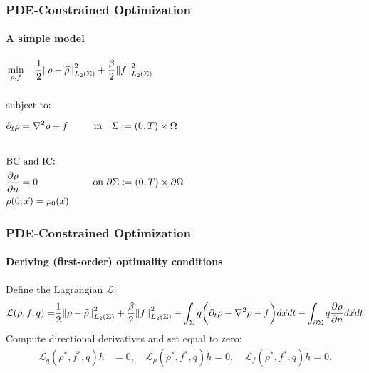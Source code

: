 \documentclass[aspectratio=169,xcolor=dvipsnames]{beamer}
\begin{document}
\begin{frame}
	\frametitle{PDE-Constrained Optimization}
	\framesubtitle{A simple model}
		\begin{align*}
		&\min_{\rho,f} \quad \frac{1}{2}\norm{\rho- \widehat{\rho}}_{L_2(\Sigma)}^2 + \frac{\beta}{2} \norm{f}_{L_2(\Sigma)}^2\\
		\\ 
		&\text{subject to:}
		\\
		& \partial_t \rho = \nabla^2 \rho + f \ \qquad \text{  in    }\ \ \Sigma := (0,T) \times \Omega  \phantom{ \nabla \cdot (\rho \vec{w})+{\nabla \cdot \int_\Omega \rho(\vec{x}) \rho(\vec{x}') \nabla V_2(|\vec{x}-\vec{x}\hspace{0.2em}'|)d\vec{x}'} }\\
		\\
		&\text{BC } \text{and IC:}\\
		&\frac{\partial \rho}{\partial n}  = 0 \quad \ \ \qquad \qquad \text{on   } \partial \Sigma := (0,T) \times \partial \Omega  \\
		&\rho(0,\vec{x}) = \rho_0(\vec{x})
		\end{align*}

\end{frame}

\begin{frame}
	\frametitle{PDE-Constrained Optimization}
		\framesubtitle{Deriving (first-order) optimality conditions}
	Define the Lagrangian $\mathcal{L}$:
	\begin{align*}
		\mathcal{L}(\rho, f,q)=& \frac{1}{2}\norm{\rho- \widehat{\rho}}_{L_2(\Sigma)}^2 + \frac{\beta}{2} \norm{f}_{L_2(\Sigma)}^2- \int_\Sigma q \bigg( \partial_t \rho - \nabla^2 \rho  - f \bigg) d\vec{x} dt - \int_{\partial \Sigma} q \frac{\partial \rho}{\partial n}   d\vec{x} dt\\
	\end{align*}
	Compute directional derivatives and set equal to zero:
	\begin{align*}
		\mathcal{L}_q (\rho^*, f^*,q) h&= 0, \quad
		\mathcal{L}_\rho (\rho^*, f^*,q) h= 0, \quad
		\mathcal{L}_f (\rho^*, f^*,q) h= 0.
	\end{align*}
\end{frame}
\end{document}
